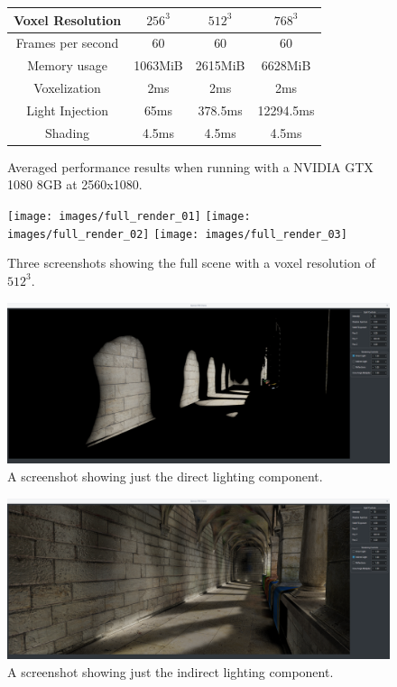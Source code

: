 \documentclass[]{acmsiggraph}
\begin{document}
\begin{figure}[htbp]\centering
\begin{center}
\begin{tabular}{|c|c|c|c|}
\hline
Voxel Resolution & $256^3$ & $512^3$ & $768^3$ \\
\hline
\hline
Frames per second & 60 & 60 & 60 \\
\hline
Memory usage & 1063MiB & 2615MiB & 6628MiB \\
\hline
Voxelization & 2ms & 2ms & 2ms \\
\hline
Light Injection & 65ms & 378.5ms & 12294.5ms\\
\hline
Shading & 4.5ms & 4.5ms & 4.5ms \\
\hline
\end{tabular}
\caption{\label{figure:performance} Averaged performance results when running with a NVIDIA GTX 1080 8GB at 2560x1080.}
\end{center}
\end{figure}
\begin{figure}[htbp]\centering
\texttt{[image: images/full\_render\_01]}
\texttt{[image: images/full\_render\_02]}
\texttt{[image: images/full\_render\_03]}
\caption{\label{figure:fullrender}Three screenshots showing the full scene with a voxel resolution of $512^3$.}
\end{figure}
\begin{figure}[htbp]\centering
\includegraphics[width=1.0\linewidth]{images/direct_only}
\caption{\label{figure:direct}A screenshot showing just the direct lighting component.}
\end{figure}
\begin{figure}[htbp]\centering
\includegraphics[width=1.0\linewidth]{images/indirect_only}
\caption{\label{figure:indirect}A screenshot showing just the indirect lighting component.}
\end{figure}
\end{document}
